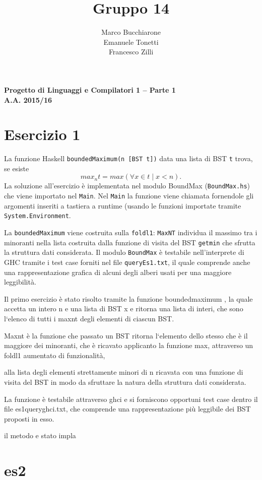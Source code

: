 \documentclass[a4paper, oneside, 11pt]{article}
\makeatletter
\renewcommand\and{\\}
\renewcommand\maketitle{%
\bigskip\bigskip\bigskip\bigskip%
\begin{center}\bfseries\large%
Progetto di Linguaggi e Compilatori 1 -- Parte 1 \\ A.A. 2015/16\\%
\end{center}%
\bigskip%
\begin{center}\bfseries\LARGE \@title  \end{center}%
\bigskip%
\begin{center}\bfseries\large \@author \end{center}%
\bigskip\bigskip}
\makeatother
\begin{document}
\title{Gruppo 14}
\author{Marco Bucchiarone \and Emanuele Tonetti \and Francesco Zilli}
\maketitle
\section{Esercizio 1}
La funzione Haskell \texttt{boundedMaximum(n [BST t])} data una lista di BST \texttt{t} trova, se esiste  \[max_{n}{t}=max(\forall x \in t \mid  x<n ).\]
La soluzione all'esercizio \`e implementata nel modulo BoundMax (\texttt{BoundMax.hs}) che viene importato nel \texttt{Main}.
Nel \texttt{Main} la funzione viene chiamata fornendole gli argomenti inseriti a tastiera a runtime (usando le funzioni importate tramite \texttt{System.Environment}.
\par
La \texttt{boundedMaximum} viene costruita sulla \texttt{foldl1}: \texttt{MaxNT} individua il massimo tra i minoranti nella lista costruita dalla funzione di visita del BST \texttt{getmin} che sfrutta la struttura dati considerata.
Il modulo \texttt{BoundMax} è testabile nell'interprete di GHC tramite i test case forniti nel file \texttt{queryEs1.txt}, il quale comprende anche una rappresentazione grafica di alcuni degli alberi usati per una maggiore leggibilità.


\newpage
Il primo esercizio \`e stato risolto tramite la funzione boundedmaximum , la quale accetta un intero n e una lista di BST x 
e ritorna una lista di interi, che sono l`elenco di tutti i maxnt degli elementi di ciascun BST. 

Maxnt \`e la funzione che passato un BST ritorna l`elemento dello stesso che \`e il maggiore dei minoranti, che \`e ricavato applicanto la funzione max,
attraverso un foldl1 aumentato di funzionalit\`a,

alla lista degli elementi strettamente minori di n ricavata con una funzione di visita del BST in 
modo da sfruttare la natura della struttura dati considerata. 

La funzione \`e testabile attraverso ghci e si forniscono opportuni test case dentro il file es1queryghci.txt, che comprende una rappresentazione più leggibile dei BST proposti in esso.

il metodo e stato impla

\section{es2}
\end{document}
